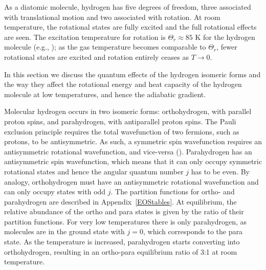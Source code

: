 \documentclass[apj]{emulateapj}
\newcommand{\App}[1]{Appendix~\ref{#1}}
\begin{document}
As a diatomic molecule, hydrogen has five degrees of freedom, three associated with translational motion and two associated with rotation. At room temperature, the rotational states are fully excited and the full rotational effects are seen. The excitation temperature for rotation is $\Theta_r \approx 85$ K for the hydrogen molecule (e.g., \citealt{kittel}); as the gas temperature becomes comparable to $\Theta_r$, fewer rotational states are excited and rotation entirely ceases as $T \rightarrow 0$. %

In this section we discuss the quantum effects of the hydrogen isomeric forms and the way they affect the rotational energy and heat capacity of the hydrogen molecule at low temperatures, and hence the adiabatic gradient. 

 Molecular hydrogen occurs in two isomeric forms: orthohydrogen, with parallel proton spins, and parahydrogen, with antiparallel proton spins. The Pauli exclusion principle requires the total wavefunction of two fermions, such as protons, to be antisymmetric. As such, a symmetric spin wavefunction requires an antisymmetric rotational wavefunction, and vice-versa (\citealt{farkas35}). Parahydrogen has an antisymmetric spin wavefunction, which means that it can only occupy symmetric rotational states and hence the angular quantum number $j$ has to be even. By analogy, orthohydrogen must have an antisymmetric rotational wavefunction and can only occupy states with odd $j$. The partition functions for ortho- and parahydrogen are described in \App{EOStables}.
 At equilibrium, the relative abundance of the ortho and para states is given by the ratio of their partition functions. For very low temperatures there is only parahydrogen, as molecules are in the ground state with $j=0$, which corresponds to the para state. As the temperature is increased, parahydrogen starts converting into orthohydrogen, resulting in an ortho-para equilibrium ratio of 3:1 at room temperature.

\end{document}
